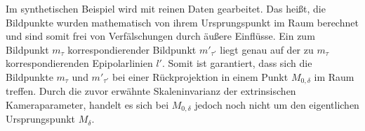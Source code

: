 %
% 
%
%
%
%

Im synthetischen Beispiel wird mit reinen Daten gearbeitet. Das heißt, die Bildpunkte wurden mathematisch von ihrem Ursprungspunkt im Raum berechnet und sind somit frei von Verfälschungen durch äußere Einflüsse. Ein zum Bildpunkt $m_\tau$ korrespondierender Bildpunkt $m'_{\tau'}$ liegt genau auf der zu $m_\tau$ korrespondierenden Epipolarlinien $l'$. Somit ist garantiert, dass sich die Bildpunkte $m_\tau$ und $m'_{\tau'}$ bei einer Rückprojektion in einem Punkt $M_{0,\delta}$ im Raum treffen. Durch die zuvor erwähnte Skaleninvarianz der extrinsischen Kameraparameter, handelt es sich bei $M_{0,\delta}$ jedoch noch nicht um den eigentlichen Ursprungspunkt $M_\delta$. \\


